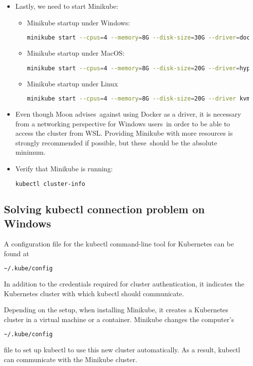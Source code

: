 \begin{itemize}
	\item Lastly, we need to start Minikube:
	\begin{itemize}
		\item Minikube startup under Windows:
		\begin{lstlisting}[language=bash]
			minikube start --cpus=4 --memory=8G --disk-size=30G --driver=docker
		\end{lstlisting}
		\item Minikube startup under MacOS:
		\begin{lstlisting}[language=bash]
			minikube start --cpus=4 --memory=8G --disk-size=20G --driver=hyperkit
		\end{lstlisting}
		\item Minikube startup under Linux
		\begin{lstlisting}[language=bash]
			minikube start --cpus=4 --memory=8G --disk-size=20G --driver kvm2
		\end{lstlisting}
	\end{itemize}
	\item Even though Moon advises against using Docker as a driver, it is necessary from a networking perspective for Windows users in order to be able to access the cluster from WSL. Providing Minikube with more resources is strongly recommended if possible, but these should be the absolute minimum.
	\item Verify that Minikube is running:
	\begin{lstlisting}[language=bash]
		kubectl cluster-info
	\end{lstlisting}
\end{itemize}

\subsection{Solving kubectl connection problem on Windows}

A configuration file for the kubectl command-line tool for Kubernetes can be found at \begin{lstlisting}[language=bash] ~/.kube/config \end{lstlisting} In addition to the credentials required for cluster authentication, it indicates the Kubernetes cluster with which kubectl should communicate.

Depending on the setup, when installing Minikube, it creates a Kubernetes cluster in a virtual machine or a container. Minikube changes the computer's \begin{lstlisting}[language=bash]~/.kube/config \end{lstlisting} file to set up kubectl to use this new cluster automatically. As a result, kubectl can communicate with the Minikube cluster.

